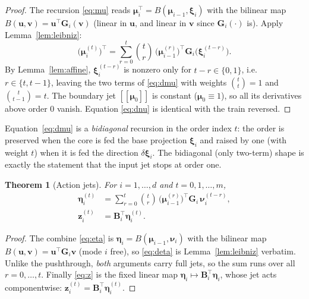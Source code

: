 \documentclass[11pt]{article}
\newcommand{\jet}[1]{[\![ #1 ]\!]}   %
\theoremstyle{definition}
\theoremstyle{plain}
\newtheorem{theorem}{Theorem}
\begin{document}
\begin{proof}
The recursion \eqref{eq:mu} reads $\boldsymbol\mu_i^\top = B(\boldsymbol\mu_{i-1},
\boldsymbol\xi_i)$ with the bilinear map $B(\mathbf u, \mathbf v) = \mathbf u^\top \mathbf G_i(\mathbf
v)$ (linear in $\mathbf u$, and linear in $\mathbf v$ since $\mathbf G_i(\cdot)$ is). Apply
Lemma~\ref{lem:leibniz}:
\[
  \big(\boldsymbol\mu_i^{(t)}\big)^\top
  = \sum_{r=0}^{t} \binom{t}{r}\, \big(\boldsymbol\mu_{i-1}^{(r)}\big)^\top
      \mathbf G_i\!\big(\boldsymbol\xi_i^{(t-r)}\big).
\]
By Lemma~\ref{lem:affine}, $\boldsymbol\xi_i^{(t-r)}$ is nonzero only for $t-r \in \{0,1\}$, i.e.\
$r \in \{t, t-1\}$, leaving the two terms of \eqref{eq:dmu} with weights $\binom{t}{t}=1$ and
$\binom{t}{t-1}=t$. The boundary jet $\jet{\boldsymbol\mu_0}$ is constant ($\boldsymbol\mu_0 \equiv
1$), so all its derivatives above order $0$ vanish. Equation \eqref{eq:dnu} is identical with the
train reversed.
\end{proof}

Equation~\eqref{eq:dmu} is a \emph{bidiagonal} recursion in the order index $t$: the order is
preserved when the core is fed the base projection $\boldsymbol\xi_i$ and raised by one (with weight
$t$) when it is fed the direction $\delta\boldsymbol\xi_i$. The bidiagonal (only two-term) shape is
exactly the statement that the input jet stops at order one.

\begin{theorem}[Action jets]
\label{thm:action}
For $i = 1, \dots, d$ and $t = 0, 1, \dots, m$,
\begin{align}
  \boldsymbol\eta_i^{(t)}
    &= \sum_{r=0}^{t} \binom{t}{r}\,
       \big(\boldsymbol\mu_{i-1}^{(r)}\big)^\top \mathbf G_i\, \boldsymbol\nu_i^{(t-r)},
    \label{eq:deta}\\[2pt]
  \mathbf z_i^{(t)} &= \mathbf B_i^\top \boldsymbol\eta_i^{(t)}.
    \label{eq:dz}
\end{align}
\end{theorem}

\begin{proof}
The combine \eqref{eq:eta} is $\boldsymbol\eta_i = B(\boldsymbol\mu_{i-1}, \boldsymbol\nu_i)$ with the
bilinear map $B(\mathbf u, \mathbf v) = \mathbf u^\top \mathbf G_i \mathbf v$ (mode $i$ free), so
\eqref{eq:deta} is Lemma~\ref{lem:leibniz} verbatim. Unlike the pushthrough, \emph{both} arguments
carry full jets, so the sum runs over all $r = 0, \dots, t$. Finally \eqref{eq:z} is the fixed
linear map $\boldsymbol\eta_i \mapsto \mathbf B_i^\top \boldsymbol\eta_i$, whose jet acts
componentwise: $\mathbf z_i^{(t)} = \mathbf B_i^\top \boldsymbol\eta_i^{(t)}$.
\end{proof}
\end{document}
